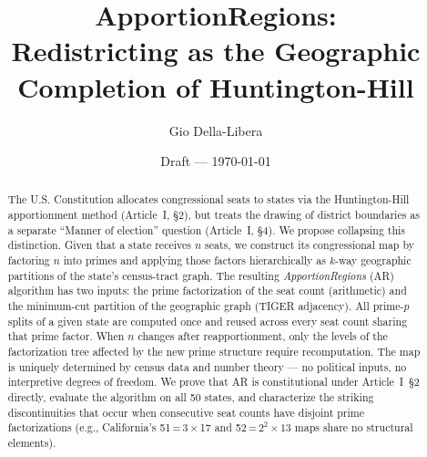 \documentclass[12pt]{article}
\title{ApportionRegions:\\
       Redistricting as the Geographic Completion of Huntington-Hill}
\author{Gio Della-Libera}
\date{Draft --- \today}
\begin{document}
\maketitle

\begin{abstract}
The U.S. Constitution allocates congressional seats to states via the
Huntington-Hill apportionment method (Article~I, \S2), but treats the drawing
of district boundaries as a separate ``Manner of election'' question (Article~I,
\S4). We propose collapsing this distinction. Given that a state receives $n$
seats, we construct its congressional map by factoring $n$ into primes and
applying those factors hierarchically as $k$-way geographic partitions of the
state's census-tract graph. The resulting \emph{ApportionRegions}
(AR) algorithm has two inputs: the prime factorization of the seat count
(arithmetic) and the minimum-cut partition of the geographic graph (TIGER
adjacency). All prime-$p$ splits of a given state are computed once and reused
across every seat count sharing that prime factor. When $n$ changes after
reapportionment, only the levels of the factorization tree affected by the new
prime structure require recomputation. The map is uniquely determined by
census data and number theory --- no political inputs, no interpretive degrees
of freedom. We prove that AR is constitutional under Article~I~\S2 directly,
evaluate the algorithm on all 50 states, and characterize the striking
discontinuities that occur when consecutive seat counts have disjoint prime
factorizations (e.g., California's 51\,=\,3\,$\times$\,17 and
52\,=\,$2^2\times 13$ maps share no structural elements).
\end{abstract}










\end{document}
